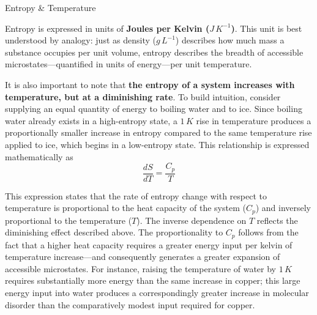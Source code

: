 \documentclass[10pt]{article}
\begin{document}
    \begin{core}{Entropy \& Temperature}

      Entropy is expressed in units of \textbf{Joules per Kelvin ($J\,K^{-1}$)}. This unit is best understood by analogy: just as density ($g\,L^{-1}$) describes how much mass a substance occupies per unit volume, entropy describes the breadth of accessible microstates---quantified in units of energy---per unit temperature.

      It is also important to note that \textbf{the entropy of a system increases with temperature, but at a diminishing rate}. To build intuition, consider supplying an equal quantity of energy to boiling water and to ice. Since boiling water already exists in a high-entropy state, a $1\,K$ rise in temperature produces a proportionally smaller increase in entropy compared to the same temperature rise applied to ice, which begins in a low-entropy state. This relationship is expressed mathematically as
      \[
        \frac{dS}{dT} = \frac{C_{p}}{T}
      \]

      This expression states that the rate of entropy change with respect to temperature is proportional to the heat capacity of the system ($C_p$) and inversely proportional to the temperature ($T$). The inverse dependence on $T$ reflects the diminishing effect described above. The proportionality to $C_p$ follows from the fact that a higher heat capacity requires a greater energy input per kelvin of temperature increase---and consequently generates a greater expansion of accessible microstates. For instance, raising the temperature of water by $1\,K$ requires substantially more energy than the same increase in copper; this large energy input into water produces a correspondingly greater increase in molecular disorder than the comparatively modest input required for copper.

    \end{core}
\end{document}
